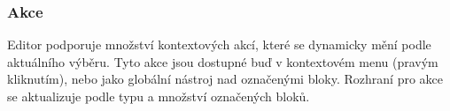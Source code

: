 









\subsubsection{Akce}

Editor podporuje množství kontextových akcí, které se dynamicky mění podle aktuálního výběru. 
Tyto akce jsou dostupné buď v kontextovém menu (pravým kliknutím), nebo jako globální nástroj nad označenými bloky. 
Rozhraní pro akce se aktualizuje podle typu a množství označených bloků.

